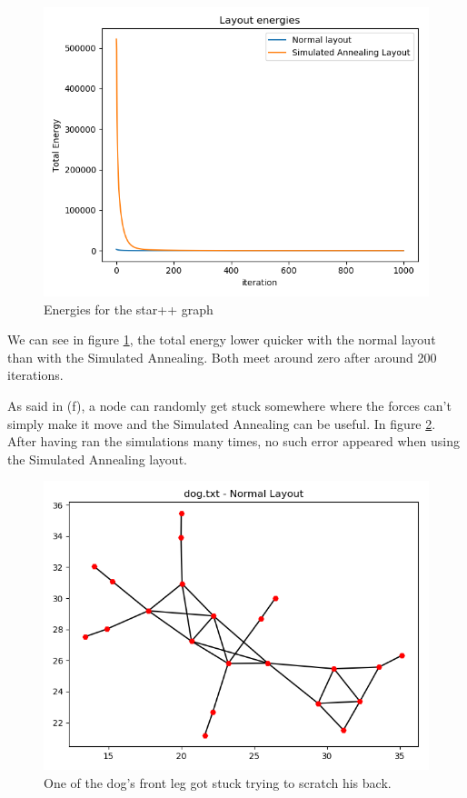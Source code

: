 \documentclass[10pt,a4paper]{article}
\begin{document}
\begin{enumerate}
\begin{figure}[H]
	\centering
	\includegraphics[width=0.7\linewidth]{../Scripts/star++_energies}
	\caption{Energies for the star++ graph}
	\label{fig:starenergies}
\end{figure}

We can see in figure \ref{fig:starenergies}, the total energy lower quicker with the normal layout than with the Simulated Annealing. Both meet around zero after around 200 iterations. 


As said in (f), a node can randomly get stuck somewhere where the forces can't simply make it move and the Simulated Annealing can be useful. In figure \ref{fig:dognormalerror}. After having ran the simulations many times, no such error appeared when using the Simulated Annealing layout. 

\begin{figure}[H]
	\centering
	\includegraphics[width=0.7\linewidth]{../Scripts/dog_normal_error}
	\caption{One of the dog's front leg got stuck trying to scratch his back. }
	\label{fig:dognormalerror}
\end{figure}





\end{enumerate}
\end{document}
